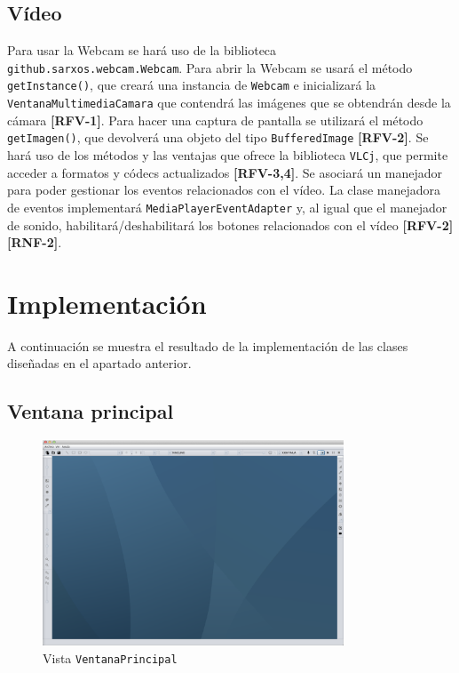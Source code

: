 \subsection{Vídeo}
Para usar la Webcam se hará uso de la biblioteca \texttt{github.sarxos.webcam.Webcam}. Para abrir la Webcam se usará el método \texttt{getInstance()}, que creará una instancia de \texttt{Webcam} e inicializará la \texttt{VentanaMultimediaCamara} que contendrá las imágenes que se obtendrán desde la cámara \textbf{[RFV-1]}. Para hacer una captura de pantalla se utilizará el método \texttt{getImagen()}, que devolverá una objeto del tipo \texttt{BufferedImage} \textbf{[RFV-2]}.
\vskip0.3cm
Se hará uso de los métodos y las ventajas que ofrece la biblioteca \texttt{VLCj}, que permite acceder a formatos y códecs actualizados \textbf{[RFV-3,4]}. Se asociará un manejador para poder gestionar los eventos relacionados con el vídeo. La clase manejadora de eventos implementará \texttt{MediaPlayerEventAdapter} y, al igual que el manejador de sonido, habilitará/deshabilitará los botones relacionados con el vídeo \textbf{[RFV-2]}\textbf{[RNF-2]}. 
\clearpage
\section{Implementación}
A continuación se muestra el resultado de la implementación de las clases diseñadas en el apartado anterior.
\subsection{Ventana principal}
\vskip0.3cm
\begin{figure}[H]
 \centering
  \includegraphics[width=0.8\textwidth]{graficos/ventanaPrincipal.png}
 \caption{Vista \texttt{VentanaPrincipal}}
 \label{diseño}
 \end{figure}
 
